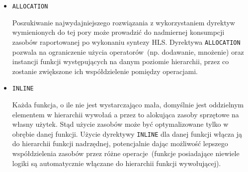 \begin{itemize}
\begin{lstlisting}[caption=Ilustracja problemu związanego z wykrywaniem zależności przez Vivado HLS i wpływu na wydajność]
while(true)
{
#pragma HLS PIPELINE
	...
	switch(inst)
	{
		case ADD:
			reg = reg + 1;
			break;
		case NEG:
			reg = -reg;
			break;
		case SQRT:
			reg = sqrt(reg);
			break;
		default:
			break;
	}
}
\end{lstlisting}
W powyższym przykładzie HLS dokonując analizy zależności pomiędzy wykorzystaniem \texttt{reg} założy konserwatywnie, że interwał przetwarzania instrukcji będzie określony poprzez instrukcję wykonującą się najdłużej~(tutaj jest to \texttt{sqrt()}), gdyż tylko wtedy istnieje pewność, że moduł będzie wykonywał się w sposób poprawny. Prowadzi to do sytuacji, że nawet instrukcja pusta~(realizowana przez \texttt{default}) będzie wykonywana tak długo jak \texttt{sqrt()}, co w jawny sposób ogranicza szybkość przetwarzania. Dyrektywa \texttt{DEPENDENCE} w założeniu pozwoli wymusić, by rozważanie zależności zostało w przypadku zmiennej \texttt{reg} pominięte\footnote{Stosując tę dyrektywę należy mieć pewność, że nie narusza to integralności algorytmu albo projektant jest w stanie poradzić sobie z ubocznymi konsekwencjami jej użycia.}.

\item \texttt{ALLOCATION}

Poszukiwanie najwydajniejszego rozwiązania z wykorzystaniem dyrektyw wymienionych do tej pory może prowadzić do nadmiernej konsumpcji zasobów raportowanej po wykonaniu syntezy HLS. Dyrektywa \texttt{ALLOCATION} pozwala na ograniczenie użycia operatorów~(np. dodawanie, mnożenie) oraz instancji funkcji występujących na danym poziomie hierarchii, przez co zostanie zwiększone ich współdzielenie pomiędzy operacjami.

\item \texttt{INLINE}

Każda funkcja, o ile nie jest wystarczająco mała, domyślnie jest oddzielnym elementem w hierarchii wywołań a przez to alokująca zasoby sprzętowe na własny użytek.  Stąd użycie zasobów może być optymalizowane tylko w obrębie danej funkcji. Użycie dyrektywy \texttt{INLINE} dla danej funkcji włącza ją do hierarchii funkcji nadrzędnej, potencjalnie dając możliwość lepszego współdzielenia zasobów przez różne operacje~(funkcje posiadające niewiele logiki są automatycznie włączane do hierarchii funkcji wywołującej).

\end{itemize}
